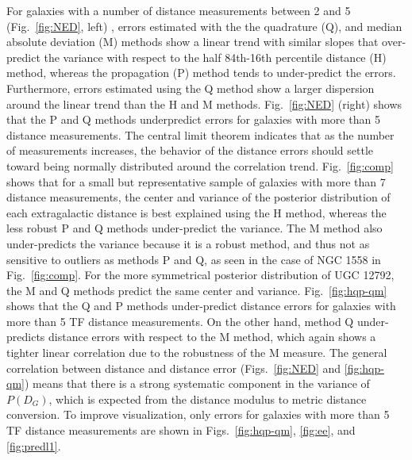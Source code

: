 \documentclass[a4paper,fleqn,usenatbib]{mnras}
\begin{document}
For galaxies with a number of distance measurements between 2 and 5  (Fig.~\ref{fig:NED}, left) , errors estimated with the the quadrature (Q), and median absolute deviation (M) methods show a linear trend with similar slopes that over-predict the variance with respect to the half 84th-16th percentile distance (H) method, whereas the propagation (P) method tends to under-predict the errors. Furthermore, errors estimated using the Q method show a larger dispersion around the linear trend than the H and M methods. Fig.~\ref{fig:NED} (right) shows that the P and Q methods underpredict errors for galaxies with more than 5 distance measurements. The central limit theorem indicates that as the number of measurements increases, the behavior of the distance errors should settle toward being normally distributed around the correlation trend. Fig.~\ref{fig:comp} shows that for a small but representative sample of galaxies with more than 7 distance measurements, the center and variance of the posterior distribution of each extragalactic distance is best explained using the H method, whereas the less robust P and Q methods under-predict the variance. The M method also under-predicts the variance because it is a robust method, and thus not as sensitive to outliers as methods P and Q, as seen in the case of NGC 1558 in Fig.~\ref{fig:comp}. For the more symmetrical posterior distribution of UGC 12792, the M and Q methods predict the same center and variance. Fig.~\ref{fig:hqp-qm} shows that the Q and P methods under-predict distance errors for galaxies with more than 5 TF distance measurements. On the other hand, method Q under-predicts distance errors with respect to the M method, which again shows a tighter linear correlation due to the robustness of the M measure. The general correlation between distance and distance error (Figs.~\ref{fig:NED} and \ref{fig:hqp-qm}) means that there is a strong systematic component in the variance of $P(D_G)$, which is expected from the distance modulus to metric distance conversion. To improve visualization, only errors for galaxies with more than 5 TF distance measurements are shown in Figs.~\ref{fig:hqp-qm}, \ref{fig:ee}, and \ref{fig:predl1}.
\end{document}
